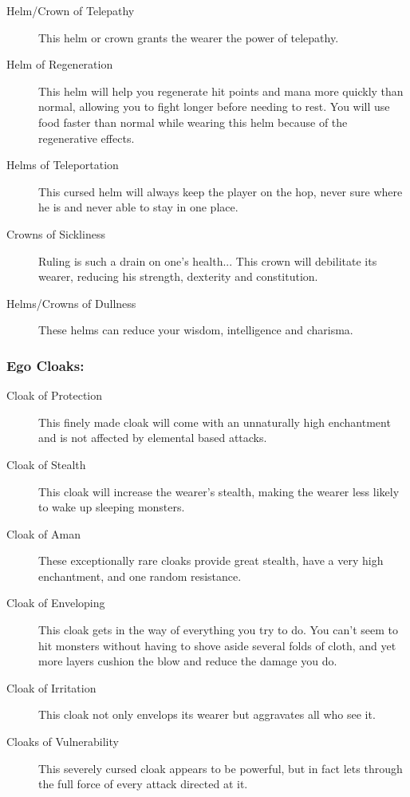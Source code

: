 \begin{description}
\item[Helm/Crown of Telepathy]
     This helm or crown grants the wearer the power of telepathy.

\item[Helm of Regeneration]
     This helm will help you regenerate hit points and mana more quickly
     than normal, allowing you to fight longer before needing to rest. You
     will use food faster than normal while wearing this helm because of
     the regenerative effects.

\item[Helms of Teleportation]
     This cursed helm will always keep the player on the hop, never sure
     where he is and never able to stay in one place.

\item[Crowns of Sickliness]
     Ruling is such a drain on one's health... This crown will debilitate
     its wearer, reducing his strength, dexterity and constitution.

\item[Helms/Crowns of Dullness]
     These helms can reduce your wisdom, intelligence and charisma.
\end{description}

\subsubsection{Ego Cloaks:}
\begin{description}
\item[Cloak of Protection]
     This finely made cloak will come with an unnaturally high enchantment
     and is not affected by elemental based attacks.

\item[Cloak of Stealth]
     This cloak will increase the wearer's stealth, making the wearer less
     likely to wake up sleeping monsters.

\item[Cloak of Aman]
     These exceptionally rare cloaks provide great stealth, have a very
     high enchantment, and one random resistance.

\item[Cloak of Enveloping]
     This cloak gets in the way of everything you try to do. You can't seem
     to hit monsters without having to shove aside several folds of cloth,
     and yet more layers cushion the blow and reduce the damage you do.

\item[Cloak of Irritation]
     This cloak not only envelops its wearer but aggravates all who see it.

\item[Cloaks of Vulnerability]
     This severely cursed cloak appears to be powerful, but in fact lets
     through the full force of every attack directed at it.
\end{description}


